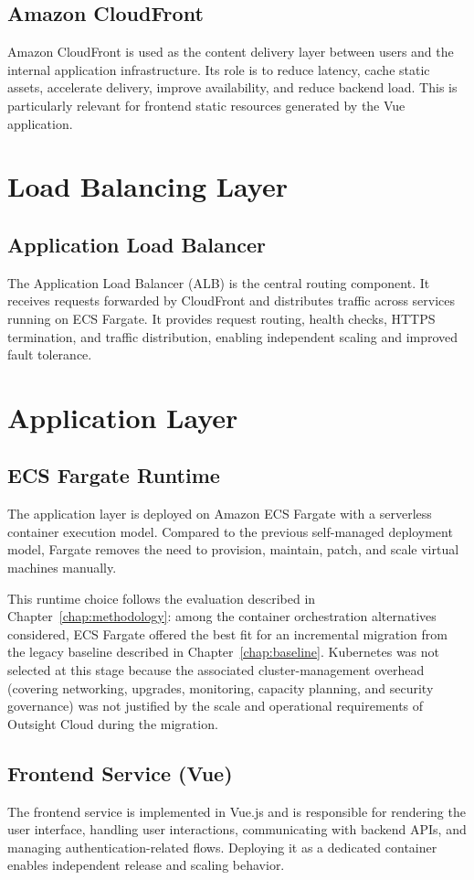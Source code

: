 \subsection{Amazon CloudFront}
Amazon CloudFront is used as the content delivery layer between users and the internal application infrastructure. Its role is to reduce latency, cache static assets, accelerate delivery, improve availability, and reduce backend load. This is particularly relevant for frontend static resources generated by the Vue application.

\section{Load Balancing Layer}
\subsection{Application Load Balancer}
The Application Load Balancer (ALB) is the central routing component. It receives requests forwarded by CloudFront and distributes traffic across services running on ECS Fargate. It provides request routing, health checks, HTTPS termination, and traffic distribution, enabling independent scaling and improved fault tolerance.

\section{Application Layer}
\subsection{ECS Fargate Runtime}
The application layer is deployed on Amazon ECS Fargate with a serverless container execution model. Compared to the previous self-managed deployment model, Fargate removes the need to provision, maintain, patch, and scale virtual machines manually.

This runtime choice follows the evaluation described in Chapter~\ref{chap:methodology}: among the container orchestration alternatives considered, ECS Fargate offered the best fit for an incremental migration from the legacy baseline described in Chapter~\ref{chap:baseline}. Kubernetes was not selected at this stage because the associated cluster-management overhead (covering networking, upgrades, monitoring, capacity planning, and security governance) was not justified by the scale and operational requirements of Outsight Cloud during the migration.

\subsection{Frontend Service (Vue)}
The frontend service is implemented in Vue.js and is responsible for rendering the user interface, handling user interactions, communicating with backend APIs, and managing authentication-related flows. Deploying it as a dedicated container enables independent release and scaling behavior.

